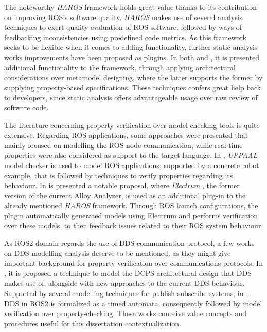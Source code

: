 The noteworthy \textit{HAROS} framework \cite{santos2016framework} holds great value thanks to its contribution on improving ROS's software quality. \textit{HAROS} makes use of several analysis techniques to exert quality evaluation of ROS software, followed by ways of feedbacking inconsistencies using predefined code metrics. As this framework seeks to be flexible when it comes to adding functionality, further static analysis works improvements have been proposed as plugins. In both  and , it is presented additional functionality to the framework, through applying architectural considerations over metamodel designing, where the latter supports the former by supplying property-based specifications. These techniques confers great help back to developers, since static analysis offers advantageable usage over raw review of software code. 

The literature concerning property verification over model checking tools is quite extensive. Regarding ROS applications, some approaches were presented that mainly focused on modelling the ROS node-communication, while real-time properties were also considered as support to the target language. In , \textit{UPPAAL} model checker is used to model ROS applications, supported by a concrete robot example, that is followed by techniques to verify properties regarding its behaviour. In  is presented a notable proposal, where \textit{Electrum} \cite{lwspecification}, the former version of the current Alloy Analyzer, is used as an additional plug-in to the already mentioned \textit{HAROS} framework. Through ROS launch configurations, the plugin automatically generated models using Electrum and performs verification over these models, to then feedback issues related to their ROS system behaviour.

As ROS2 domain regards the use of DDS communication protocol, a few works on DDS modelling analysis deserve to be mentioned, as they might give important background for property verification over communications protocols. In , it is proposed a technique to model the DCPS architectural design that DDS makes use of, alongside with new approaches to the current DDS behaviour. Supported by several modelling techniques for publish-subscribe systems, in , DDS in ROS2 is formalized as a timed automata, consequently followed by model verification over property-checking. These works conceive value concepts and procedures useful for this dissertation contextualization.

